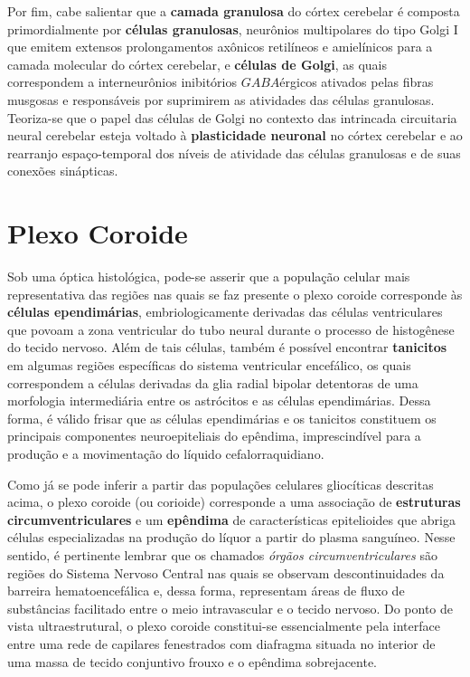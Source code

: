 \documentclass[
]{book}
\theoremstyle{definition}
\theoremstyle{definition}
\theoremstyle{definition}
\theoremstyle{definition}
\theoremstyle{remark}
\begin{document}
Por fim, cabe salientar que a \textbf{camada granulosa} do córtex cerebelar é composta primordialmente por \textbf{células granulosas}, neurônios multipolares do tipo Golgi I que emitem extensos prolongamentos axônicos retilíneos e amielínicos para a camada molecular do córtex cerebelar, e \textbf{células de Golgi}, as quais correspondem a interneurônios inibitórios \(GABA\)érgicos ativados pelas fibras musgosas e responsáveis por suprimirem as atividades das células granulosas. Teoriza-se que o papel das células de Golgi no contexto das intrincada circuitaria neural cerebelar esteja voltado à \textbf{plasticidade neuronal} no córtex cerebelar e ao rearranjo espaço-temporal dos níveis de atividade das células granulosas e de suas conexões sinápticas.

\hypertarget{plexo-coroide}{%
\chapter{Plexo Coroide}\label{plexo-coroide}}

Sob uma óptica histológica, pode-se asserir que a população celular mais representativa das regiões nas quais se faz presente o plexo coroide corresponde às \textbf{células ependimárias}, embriologicamente derivadas das células ventriculares que povoam a zona ventricular do tubo neural durante o processo de histogênese do tecido nervoso. Além de tais células, também é possível encontrar \textbf{tanicitos} em algumas regiões específicas do sistema ventricular encefálico, os quais correspondem a células derivadas da glia radial bipolar detentoras de uma morfologia intermediária entre os astrócitos e as células ependimárias. Dessa forma, é válido frisar que as células ependimárias e os tanicitos constituem os principais componentes neuroepiteliais do epêndima, imprescindível para a produção e a movimentação do líquido cefalorraquidiano.

Como já se pode inferir a partir das populações celulares gliocíticas descritas acima, o plexo coroide (ou corioide) corresponde a uma associação de \textbf{estruturas circumventriculares} e um \textbf{epêndima} de características epitelioides que abriga células especializadas na produção do líquor a partir do plasma sanguíneo. Nesse sentido, é pertinente lembrar que os chamados \emph{órgãos circumventriculares} são regiões do Sistema Nervoso Central nas quais se observam descontinuidades da barreira hematoencefálica e, dessa forma, representam áreas de fluxo de substâncias facilitado entre o meio intravascular e o tecido nervoso. Do ponto de vista ultraestrutural, o plexo coroide constitui-se essencialmente pela interface entre uma rede de capilares fenestrados com diafragma situada no interior de uma massa de tecido conjuntivo frouxo e o epêndima sobrejacente.
\end{document}
